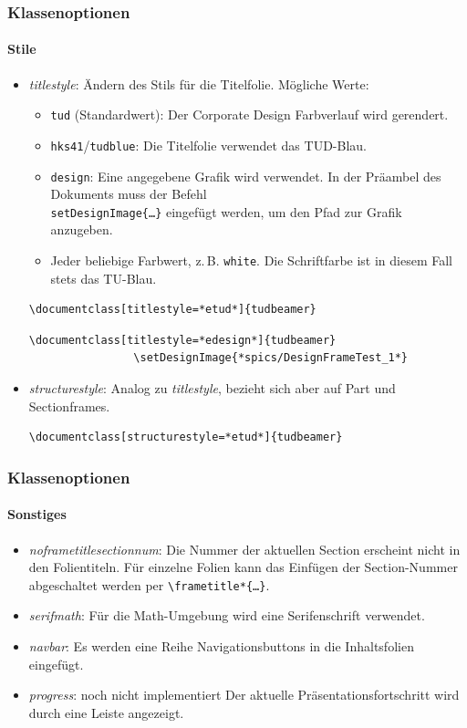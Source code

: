 \documentclass[german,notoc,draft]{tudbeamer}%
\begin{document}
\begin{frame}[fragile]
	\frametitle{Klassenoptionen}
	\framesubtitle{Stile}
	\begin{itemize}
		\item \emph{titlestyle}: Ändern des Stils für die Titelfolie. Mögliche Werte:
			\begin{itemize}
				\item \texttt{tud} (Standardwert): Der Corporate Design Farbverlauf wird gerendert.
				\item \texttt{hks41}/\texttt{tudblue}: Die Titelfolie verwendet das TUD-Blau.
				\item \texttt{design}: Eine angegebene Grafik wird verwendet. In der Präambel des Dokuments muss der Befehl \texttt{\\setDesignImage\{\dots\}} eingefügt werden, um den Pfad zur Grafik anzugeben.
				\item Jeder beliebige Farbwert, z.\,B. \texttt{white}. Die Schriftfarbe ist in diesem Fall stets das TU-Blau.
			\end{itemize}
			\begin{lstlisting}[gobble=8,style=latex,numbers=none]
				\documentclass[titlestyle=*etud*]{tudbeamer}
			\end{lstlisting} 
			\begin{lstlisting}[gobble=8,style=latex]
				\documentclass[titlestyle=*edesign*]{tudbeamer}
				\setDesignImage{*spics/DesignFrameTest_1*}
			\end{lstlisting} 
		\item \emph{structurestyle}: Analog zu \emph{titlestyle}, bezieht sich aber auf Part und Sectionframes.
			\begin{lstlisting}[gobble=8,style=latex,numbers=none]
				\documentclass[structurestyle=*etud*]{tudbeamer}
			\end{lstlisting} 
	\end{itemize}
\end{frame}
\begin{frame}
	\frametitle{Klassenoptionen}
	\framesubtitle{Sonstiges}
	\begin{itemize}
		\item \emph{noframetitlesectionnum}: Die Nummer der aktuellen Section erscheint nicht in den Folientiteln. Für einzelne Folien kann das Einfügen der Section-Nummer abgeschaltet werden per \texttt{\textbackslash frametitle*\{\dots\}}.
		\item \emph{serifmath}: Für die Math-Umgebung wird eine Serifenschrift verwendet.
		\item \emph{navbar}: Es werden eine Reihe Navigationsbuttons in die Inhaltsfolien eingefügt.
		\item \emph{progress}: {\color{alert} noch nicht implementiert} Der aktuelle Präsentationsfortschritt wird durch eine Leiste angezeigt.
	\end{itemize}
\end{frame}
\end{document}
